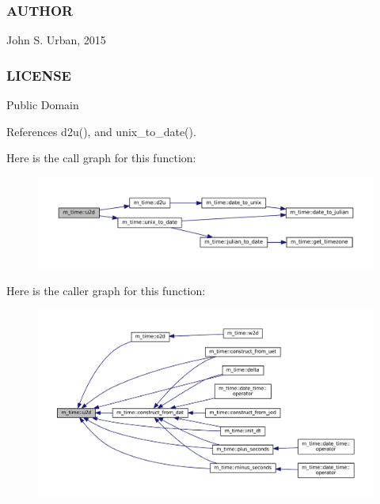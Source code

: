 \subsubsection*{A\+U\+T\+H\+OR}

John S. Urban, 2015 \subsubsection*{L\+I\+C\+E\+N\+SE}

Public Domain 

References d2u(), and unix\+\_\+to\+\_\+date().

Here is the call graph for this function\+:\nopagebreak
\begin{figure}[H]
\begin{center}
\leavevmode
\includegraphics[width=350pt]{namespacem__time_a083bc231f8ba1879d7f86ab424e77d6c_cgraph}
\end{center}
\end{figure}
Here is the caller graph for this function\+:\nopagebreak
\begin{figure}[H]
\begin{center}
\leavevmode
\includegraphics[width=350pt]{namespacem__time_a083bc231f8ba1879d7f86ab424e77d6c_icgraph}
\end{center}
\end{figure}
\mbox{\label{namespacem__time_acc62ada23f8fa2fe67b428702fbcbf1c}} 
